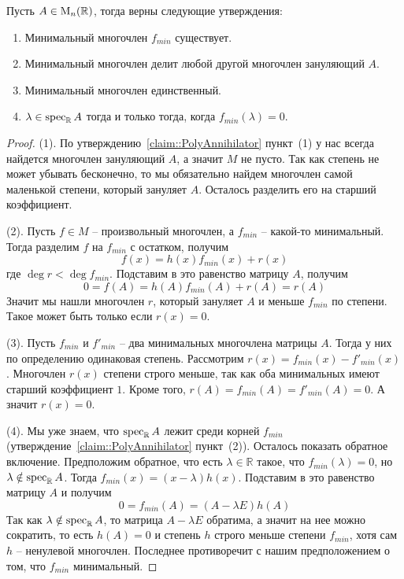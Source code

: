 \begin{claim}
\label{claim::MinPoly}
Пусть $A\in \operatorname{M}_{n}(\mathbb R)$, тогда верны следующие утверждения:
\begin{enumerate}
\item Минимальный многочлен $f_{min}$ существует.

\item Минимальный многочлен делит любой другой многочлен зануляющий $A$.

\item Минимальный многочлен единственный.

\item $\lambda\in\operatorname{spec}_\mathbb R A$ тогда и только тогда, когда $f_{min}(\lambda) = 0$.
\end{enumerate}
\end{claim}
\begin{proof}
(1).
По утверждению~\ref{claim::PolyAnnihilator} пункт~(1) у нас всегда найдется многочлен зануляющий $A$, а значит $M$ не пусто.
Так как степень не может убывать бесконечно, то мы обязательно найдем многочлен самой маленькой степени, который зануляет $A$.
Осталось разделить его на старший коэффициент.

(2).
Пусть $f\in M$ -- произвольный многочлен, а $f_{min}$ -- какой-то минимальный.
Тогда разделим $f$ на $f_{min}$ с остатком, получим 
\[
f(x) = h(x)f_{min}(x) + r(x)
\]
где $\deg r < \deg f_{min}$.
Подставим в это равенство матрицу $A$, получим
\[
0 = f(A) = h(A)f_{min}(A) + r(A) = r(A)
\]
Значит мы нашли многочлен $r$, который зануляет $A$ и меньше $f_{min}$ по степени.
Такое может быть только если $r(x) = 0$.

(3).
Пусть $f_{min}$ и $f'_{min}$ -- два минимальных многочлена матрицы $A$.
Тогда у них по определению одинаковая степень.
Рассмотрим $r(x) = f_{min}(x) - f'_{min}(x)$.
Многочлен $r(x)$ степени строго меньше, так как оба минимальных имеют старший коэффициент $1$.
Кроме того, $r(A) = f_{min }(A) = f'_{min}(A) = 0$.
А значит $r(x) = 0$.

(4).
Мы уже знаем, что $\operatorname{spec}_\mathbb RA$ лежит среди корней $f_{min}$ (утверждение~\ref{claim::PolyAnnihilator} пункт~(2)).
Осталось показать обратное включение.
Предположим обратное, что есть $\lambda\in \mathbb R$ такое, что $f_{min}(\lambda) = 0$, но $\lambda\notin\operatorname{spec}_\mathbb RA$.
Тогда $f_{min}(x) = (x-\lambda)h(x)$.
Подставим в это равенство матрицу $A$ и получим 
\[
0 = f_{min}(A) = (A - \lambda E)h(A)
\]
Так как $\lambda\notin\operatorname{spec}_\mathbb R A$, то матрица $A-\lambda E$ обратима, а значит на нее можно сократить, то есть $h(A) = 0$ и степень $h$ строго меньше степени $f_{min}$, хотя сам $h$ -- ненулевой многочлен.
Последнее противоречит с нашим предположением о том, что $f_{min}$ минимальный.
\end{proof}

